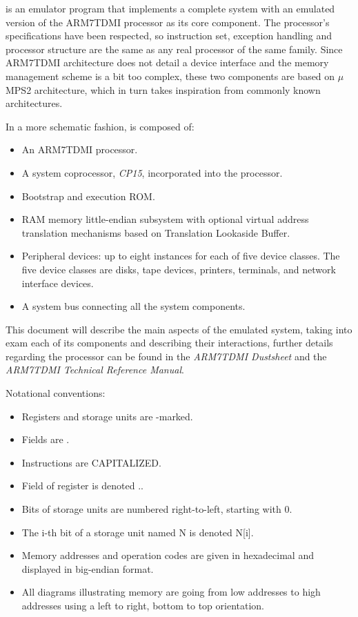 
\uarm{} is an emulator program that implements a complete system with an emulated version of the ARM7TDMI processor as its core component.
The processor's specifications have been respected, so instruction set, exception handling and processor structure are the same as any real processor of the same family.
Since ARM7TDMI architecture does not detail a device interface and the memory management scheme is a bit too complex, these two components are based on $\mu$MPS2 architecture, which in turn takes inspiration from commonly known architectures.

In a more schematic fashion, \uarm{} is composed of:
\begin{itemize}
	\item An ARM7TDMI processor.
	\item A system coprocessor, \emph{CP15}, incorporated into the processor.
	\item Bootstrap and execution ROM.
	\item RAM memory little-endian subsystem with optional virtual address translation mechanisms based on Translation Lookaside Buffer.
	\item Peripheral devices: up to eight instances for each of five device classes. 
		The five device classes are disks, tape devices, printers, terminals, and network interface devices.
	\item A system bus connecting all the system components.
\end{itemize}

This document will describe the main aspects of the emulated system, taking into exam each of its components and describing their interactions, further details regarding the processor can be found in the \emph{ARM7TDMI Dustsheet} and the \emph{ARM7TDMI Technical Reference Manual}.

Notational conventions:

\begin{itemize}
	\item Registers and storage units are -marked.
	\item Fields are .
	\item Instructions are CAPITALIZED.
	\item Field  of register  is denoted ..
	\item Bits of storage units are numbered right-to-left, starting with 0.
	\item The i-th bit of a storage unit named N is denoted N[i].
	\item Memory addresses and operation codes are given in hexadecimal and displayed in big-endian format.
	\item All diagrams illustrating memory are going from low addresses to high addresses using a left to right, bottom to top orientation.
\end{itemize}

